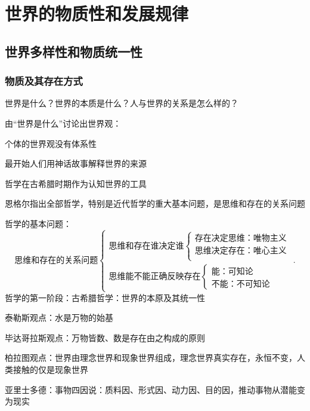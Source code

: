 \section{世界的物质性和发展规律}%
\label{sec:世界的物质性和发展规律}
\subsection{世界多样性和物质统一性}%
\label{sub:世界多样性和物质统一性}
\subsubsection*{物质及其存在方式}%
\label{subsub:物质及其存在方式}
\begin{question}
    世界是什么？世界的本质是什么？人与世界的关系是怎么样的？
\end{question}
由“世界是什么”讨论出世界观：
\begin{notation}
    个体的世界观没有体系性
\end{notation}

最开始人们用神话故事解释世界的来源
\begin{notation}
    哲学在古希腊时期作为认知世界的工具

    恩格尔指出全部哲学，特别是近代哲学的重大基本问题，是思维和存在的关系问题
\end{notation}
哲学的基本问题：
\[
    \text{思维和存在的关系问题}
    \begin{cases}
        \text{思维和存在谁决定谁}\begin{cases}
            \text{存在决定思维：唯物主义}\\ 
            \text{思维决定存在：唯心主义}\\ 
        \end{cases}\\ 
        \text{思维能不能正确反映存在}\begin{cases}
            \text{能：可知论}\\ 
            \text{不能：不可知论}
        \end{cases}
    \end{cases}
.\] 
哲学的第一阶段：古希腊哲学：世界的本原及其统一性
\begin{notation}
    泰勒斯观点：水是万物的始基

    毕达哥拉斯观点：万物皆数、数是存在由之构成的原则

    柏拉图观点：世界由理念世界和现象世界组成，理念世界真实存在，永恒不变，人类接触的仅是现象世界

    亚里士多德：事物四因说：质料因、形式因、动力因、目的因，推动事物从潜能变为现实
\end{notation}

